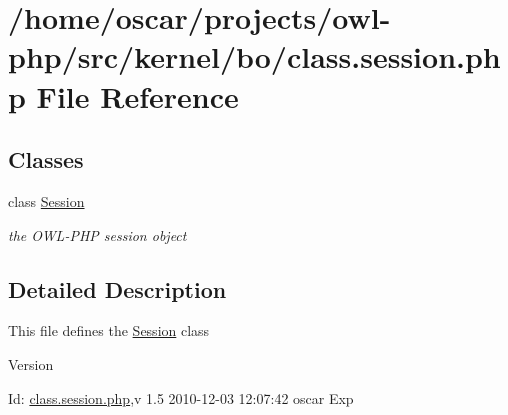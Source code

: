 \section{/home/oscar/projects/owl-\/php/src/kernel/bo/class.session.php File Reference}
\label{class_8session_8php}
\subsection*{Classes}
\begin{DoxyCompactItemize}
\item 
class \hyperlink{classSession}{Session}
\begin{DoxyCompactList}\small\item\em the OWL-\/PHP session object \item\end{DoxyCompactList}\end{DoxyCompactItemize}


\subsection{Detailed Description}
This file defines the \hyperlink{classSession}{Session} class \begin{DoxyVersion}{Version}

\end{DoxyVersion}
\begin{DoxyParagraph}{Id:}
\hyperlink{class_8session_8php}{class.session.php},v 1.5 2010-\/12-\/03 12:07:42 oscar Exp 
\end{DoxyParagraph}
